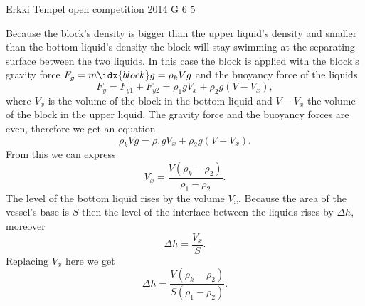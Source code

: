 \documentclass[11pt]{article}
\begin{document}
{Erkki Tempel} %
{open competition} %
{2014} %
{G 6} %
{5} %
{

\ifEngSolution
Because the block’s density is bigger than the upper liquid’s density and smaller than the bottom liquid’s density the block will stay swimming at the separating surface between the two liquids. In this case the block is applied with the block’s gravity force $F_g = m\idx{block}g=\rho_k Vg$ and the buoyancy force of the liquids 
\[ F_y=F_{y1}+F_{y2}=\rho_1gV_x + \rho_2g(V-V_x), \]
where $V_x$ is the volume of the block in the bottom liquid and $V-V_x$ the volume of the block in the upper liquid. The gravity force and the buoyancy forces are even, therefore we get an equation 
\[ \rho_k Vg = \rho_1gV_x + \rho_2g(V-V_x). \]
From this we can express
\[ V_x = \frac{V(\rho_k-\rho_2)}{\rho_1-\rho_2}. \]
The level of the bottom liquid rises by the volume $V_x$. Because the area of the vessel’s base is $S$ then the level of the interface between the liquids rises by $\Delta h$, moreover
\[ \Delta h = \frac{V_x}{S}. \]
Replacing $V_x$ here we get
\[ \Delta h = \frac{V(\rho_k-\rho_2)}{S(\rho_1-\rho_2)}. \]
\fi
}
\end{document}
